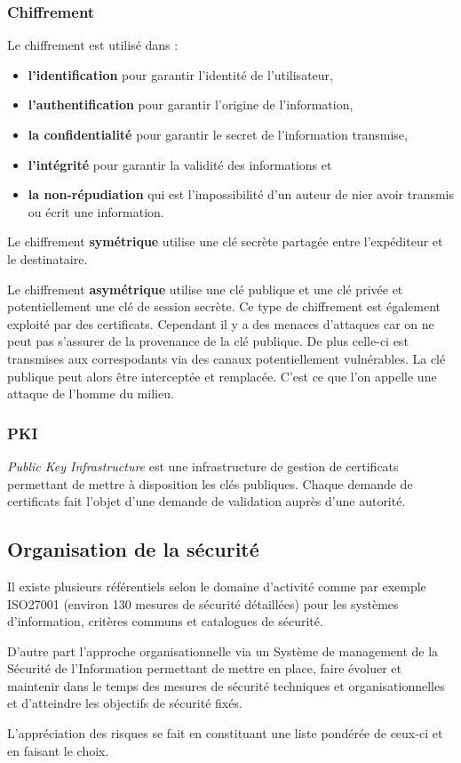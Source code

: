 \documentclass[12pt, a4paper]{article}
\begin{document}
	\subsubsection{Chiffrement}
	Le chiffrement est utilisé dans :
	\begin{itemize}
		\item \textbf{l'identification} pour garantir l'identité de l'utilisateur,
		\item \textbf{l'authentification} pour garantir l'origine de l'information,
		\item \textbf{la confidentialité} pour garantir le secret de l'information
		transmise,
		\item \textbf{l'intégrité} pour garantir la validité des informations et
		\item \textbf{la non-répudiation} qui est l'impossibilité d'un auteur de
		nier avoir transmis ou écrit une information.
	\end{itemize}
	Le chiffrement \textbf{symétrique} utilise une clé secrète partagée entre
	l'expéditeur et le destinataire.
	\par
	Le chiffrement \textbf{asymétrique} utilise une clé publique et une clé privée
	 et potentiellement une clé de session secrète. Ce type de chiffrement est
	également exploité par des certificats. Cependant il y a des menaces
	d'attaques car on ne peut pas s'assurer de la provenance de la clé publique.
	De plus celle-ci est transmises aux correspodants via des canaux
	potentiellement vulnérables. La clé publique peut alors être interceptée et
	remplacée. C'est ce que l'on appelle une attaque de l'homme du milieu.
	\subsubsection{PKI}
	\textit{Public Key Infrastructure} est une infrastructure de gestion de
	certificats permettant de mettre à disposition les clés publiques. Chaque
	demande de certificats fait l'objet d'une demande de validation auprès d'une
	autorité.
	\subsection{Organisation de la sécurité}
	Il existe plusieurs référentiels selon le domaine d'activité comme par exemple
	 ISO27001 (environ 130 mesures de sécurité détaillées) pour les systèmes
	d'information, critères communs et catalogues de sécurité.
	\par
	D'autre part l'approche organisationnelle via un Système de management de la
	Sécurité de l'Information permettant de mettre en place, faire évoluer et
	maintenir dans le temps des mesures de sécurité techniques et
	organisationnelles et d'atteindre les objectifs de sécurité fixés.
	\par
	L'appréciation des risques se fait en constituant une liste pondérée de
	ceux-ci et en faisant le choix.
\end{document}
